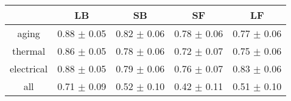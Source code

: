 \begin{tabular}{c c c c c }
\hline
 & LB & SB & SF & LF \\
\hline
aging & 0.88 $\pm$ 0.05 & 0.82 $\pm$ 0.06 & 0.78 $\pm$ 0.06 & 0.77 $\pm$ 0.06 \\
thermal & 0.86 $\pm$ 0.05 & 0.78 $\pm$ 0.06 & 0.72 $\pm$ 0.07 & 0.75 $\pm$ 0.06 \\
electrical & 0.88 $\pm$ 0.05 & 0.79 $\pm$ 0.06 & 0.76 $\pm$ 0.07 & 0.83 $\pm$ 0.06 \\
all & 0.71 $\pm$ 0.09 & 0.52 $\pm$ 0.10 & 0.42 $\pm$ 0.11 & 0.51 $\pm$ 0.10 \\
\hline
\end{tabular}